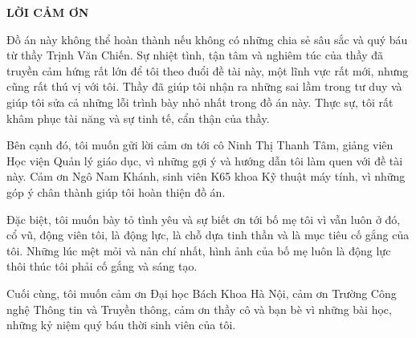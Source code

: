 \documentclass[../main.tex]{subfiles}
\begin{document}
\begin{center}
    \Large{\textbf{LỜI CẢM ƠN}}\\
\end{center}
\vspace{1cm}

Đồ án này không thể hoàn thành nếu không có những chia sẻ sâu sắc và quý báu từ thầy Trịnh Văn Chiến. Sự nhiệt tình, tận tâm và nghiêm túc của thầy đã truyền cảm hứng rất lớn để tôi theo đuổi đề tài này, một lĩnh vực rất mới, nhưng cũng rất thú vị với tôi. Thầy đã giúp tôi nhận ra những sai lầm trong tư duy và giúp tôi sửa cả những lỗi trình bày nhỏ nhất trong đồ án này. Thực sự, tôi rất khâm phục tài năng và sự tinh tế, cẩn thận của thầy. 

Bên cạnh đó, tôi muốn gửi lời cảm ơn tới cô Ninh Thị Thanh Tâm, giảng viên Học viện Quản lý giáo dục, vì những gợi ý và hướng dẫn tôi làm quen với đề tài này. Cảm ơn Ngô Nam Khánh, sinh viên K65 khoa Kỹ thuật máy tính, vì những góp ý chân thành giúp tôi hoàn thiện đồ án. 

Đặc biệt, tôi muốn bày tỏ tình yêu và sự biết ơn tới bố mẹ tôi vì vẫn luôn ở đó, cổ vũ, động viên tôi, là động lực, là chỗ dựa tinh thần và là mục tiêu cố gắng của tôi. Những lúc mệt mỏi và nản chí nhất, hình ảnh của bố mẹ luôn là động lực thôi thúc tôi phải cố gắng và sáng tạo. 

Cuối cùng, tôi muốn cảm ơn Đại học Bách Khoa Hà Nội, cảm ơn Trường Công nghệ Thông tin và Truyền thông, cảm ơn thầy cô và bạn bè vì những bài học, những kỷ niệm quý báu thời sinh viên của tôi.
\end{document}
